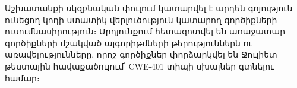 {
Աշխատանքի սկզբնական փուլում կատարվել է արդեն գոյություն ունեցող կոդի ստատիկ վերլուծություն կատարող գործիքների
ուսումնասիրություն։ Արդյունքում հետազոտվել են առաջատար գործիքների մշակված ալգորիթմների թերություններն ու
առավելությունները, որոշ գործիքներ փորձարկվել են Ջուլիետ թեստային հավաքածույում՝ CWE-401 տիպի սխալներ\cite{CWE401}
գտնելու համար։
















}